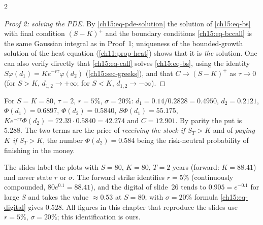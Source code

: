 \begin{paracol}{2}
\begin{proof}[Proof 2: solving the PDE]
By \eqref{ch15:eq-pde-solution} the solution of \eqref{ch15:eq-bs} with final condition $(S-K)^+$ and the boundary conditions \eqref{ch15:eq-bccall} is the same Gaussian integral as in Proof~1; uniqueness of
the bounded-growth solution of the heat equation (\cref{ch11:prop-heat}) shows that it is \emph{the} solution. One can also verify directly that \eqref{ch15:eq-call} solves \eqref{ch15:eq-bs}, using the identity
$S\varphi(d_1)=Ke^{-r\tau}\varphi(d_2)$ (\cref{ch15:sec-greeks}), and that $C\to(S-K)^+$ as $\tau\to0$ (for $S>K$, $d_{1,2}\to+\infty$; for $S<K$, $d_{1,2}\to-\infty$).
\end{proof}

\begin{example}\label{ch15:ex-atm}
For $S=K=80$, $\tau=2$, $r=5\%$, $\sigma=20\%$: $d_1=0.14/0.2828=0.4950$, $d_2=0.2121$, $\Phi(d_1)=0.6897$, $\Phi(d_2)=0.5840$,
$S\Phi(d_1)=55.175$, $Ke^{-r\tau}\Phi(d_2)=72.39\cdot0.5840=42.274$ and $C=12.901$. By parity the put is $5.288$.
The two terms are the price of \emph{receiving the stock if $S_T>K$} and of \emph{paying $K$ if $S_T>K$}, the number $\Phi(d_2)=0.584$ being the risk-neutral probability of finishing in the money.
\end{example}

\begin{coursenote}
The slides label the plots with $S=80$, $K=80$, $T=2$ years (forward: $K=88.41$) and never state $r$ or $\sigma$. The forward strike identifies $r=5\%$ (continuously compounded, $80e^{0.1}=88.41$), and the digital of slide~26 tends to $0.905=e^{-0.1}$ for large $S$ and takes the value $\approx0.53$ at $S=80$;
with $\sigma=20\%$ formula \eqref{ch15:eq-digital} gives $0.528$. All figures in this chapter that reproduce the slides use $r=5\%$, $\sigma=20\%$; this identification is ours.
\end{coursenote}


\end{paracol}
